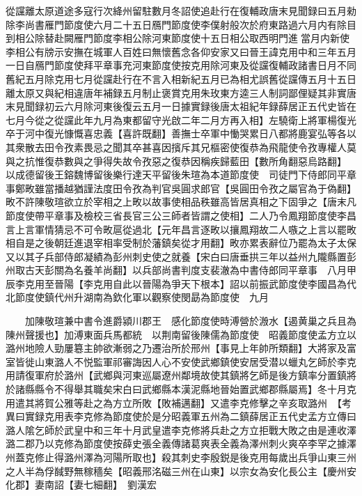 從讜離太原道途多寇行次絳州留駐數月冬詔使追赴行在復輔政唐末見聞録曰五月勑除李尚書雁門節度使六月二十五日鴈門節度使李僕射般次於府東路過六月内有除目到相公除替赴闕雁門節度李相公除河東節度使十五日相公取西明門進當月内新使李相公有牓示安撫在城軍人百姓曰無懷舊念各仰安家又曰晉王諱克用中和三年五月一日自鴈門節度使拜平章事充河東節度使按克用除河東及從讜復輔政諸書日月不同舊紀五月除克用七月從讜赴行在不言入相新紀五月已為相尤誤舊從讜傳五月十五日離太原又與紀相違唐年補録五月制止褒賞克用朱玫東方逵三人制詞鄙俚疑其非實唐末見聞録初云六月除河東後復云五月一日據實録後唐太祖紀年録薛居正五代史皆在七月今從之從讜此年九月為東都留守光啟二年二月方再入相】左驍衛上將軍楊復光卒于河中復光慷慨喜忠義【喜許既翻】善撫士卒軍中慟哭累日八都將鹿宴弘等各以其衆散去田令孜素畏忌之聞其卒甚喜因擯斥其兄樞密使復恭為飛龍使令孜專權人莫與之抗惟復恭數與之爭得失故令孜惡之復恭因稱疾歸藍田【數所角翻惡烏路翻】　以成德留後王鎔魏博留後樂行達天平留後朱瑄為本道節度使　司徒門下侍郎同平章事鄭畋雖當播越猶謹法度田令孜為判官吳圓求郎官【吳圓田令孜之屬官為于偽翻】畋不許陳敬瑄欲立於宰相之上畋以故事使相品秩雖高皆居真相之下固爭之【唐末凡節度使帶平章事及檢校三省長官三公三師者皆謂之使相】二人乃令鳳翔節度使李昌言上言軍情猜忌不可令畋扈從過北【元年昌言逐畋以攘鳳翔故二人嗾之上言以罷畋相自是之後朝廷進退宰相率受制於藩鎮矣從才用翻】畋亦累表辭位乃罷為太子太保又以其子兵部侍郎凝績為彭州刺史使之就養【宋白曰唐垂拱三年以益州九隴縣置彭州取古天彭關為名養羊尚翻】以兵部尚書判度支裴澈為中書侍郎同平章事　八月甲辰李克用至晉陽【李克用自此以晉陽為爭天下根本】詔以前振武節度使李國昌為代北節度使鎮代州升湖南為欽化軍以觀察使閔勗為節度使　九月

　　加陳敬瑄兼中書令進爵潁川郡王　感化節度使時溥營於溵水【遏黄巢之兵且為陳州聲援也】加溥東面兵馬都統　以荆南留後陳儒為節度使　昭義節度使孟方立以潞州地險人勁屢簒主帥欲漸弱之乃遷治所於邢州【事見上年帥所類翻】大將家及富室皆徙山東潞人不悦監軍祁審誨因人心不安使武鄉鎮使安居受潜以蠟丸乞師於李克用請復軍府於潞州【武鄉與河東巡屬遼州鄰境故使其鎮將乞師是後方鎮率分置鎮將於諸縣縣令不得舉其職矣宋白曰武鄉縣本漢泥縣地晉始置武鄉郡縣屬焉】冬十月克用遣其將賀公雅等赴之為方立所敗【敗補邁翻】又遣李克修擊之辛亥取潞州　【考異曰實録克用表李克修為節度使於是分昭義軍五州為二鎮薛居正五代史孟方立傳曰潞人隂乞師於武皇中和三年十月武皇遣李克修將兵赴之方立拒戰大敗之由是連收澤潞二郡乃以克修為節度使按薛史張全義傳諸葛爽表全義為澤州刺火爽卒李罕之據澤州蓋克修止得潞州澤為河陽所取也】殺其刺史李殷鋭是後克用每歲出兵爭山東三州之人半為俘馘野無稼穡矣【昭義邢洺磁三州在山東】以宗女為安化長公主【慶州安化郡】妻南詔【妻七細翻】　劉漢宏

